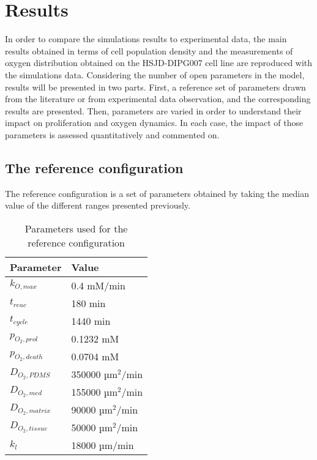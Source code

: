 \documentclass[11pt,a4paper]{article}
\begin{document}
\section{Results}
In order to compare the simulations results to experimental data, the main results obtained in terms of cell population density and the measurements of oxygen distribution obtained on the HSJD-DIPG007 cell line are reproduced with the simulations data. Considering the number of open parameters in the model, results will be presented in two parts. First, a reference set of parameters drawn from the literature or from experimental data observation, and the corresponding results are presented. Then, parameters are varied in order to understand their impact on proliferation and oxygen dynamics. In each case, the impact of those parameters is assessed quantitatively and commented on.

\subsection{The reference configuration}
The reference configuration is a set of parameters obtained by taking the median value of the different ranges presented previously. 

\begin{table}
\begin{center}
\begin{tabular}{ |p{25mm}|p{30mm}| }
\hline
 \textbf{Parameter}  & \textbf{Value} \\
 \hline
  \hline
 $k_{O,max}$ & 0.4 mM/min\\
  \hline
 $t_{reac}$ & 180 min \\ 
  \hline
   $t_{cycle}$ & 1440 min  \\
 \hline 
 $p_{O_2,prol}$ & 0.1232 mM \\
  \hline
 $p_{O_2,death}$ & 0.0704 mM \\
 \hline
 $D_{O_2,PDMS}$ & 350000 µm$^2$/min \\
 \hline 
  $D_{O_2,med}$ & 155000 µm$^2$/min \\
 \hline 
  $D_{O_2,matrix}$ & 90000 µm$^2$/min \\
 \hline
  $D_{O_2,tissue}$ & 50000 µm$^2$/min \\
    \hline
  $k_{l}$ & 18000 µm/min  \\
 \hline 
\end{tabular}
\caption{Parameters used for the reference configuration  \label{tab:1}}
\end{center}
\end{table}
\end{document}
